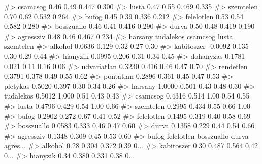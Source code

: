 \documentclass[
  letterpaper,
]{krantz}
\makeatletter
\newenvironment{Shaded}{\begin{snugshade}}{\end{snugshade}}
\newcommand{\CommentTok}[1]{\textcolor[rgb]{0.37,0.37,0.37}{#1}}
\newenvironment{kframe}{%
\medskip{}
\setlength{\fboxsep}{.8em}
 \def\at@end@of@kframe{}%
 \ifinner\ifhmode%
  \def\at@end@of@kframe{\end{minipage}}%
  \begin{minipage}{\columnwidth}%
 \fi\fi%
 \def\FrameCommand##1{\hskip\@totalleftmargin \hskip-\fboxsep
 \colorbox{shadecolor}{##1}\hskip-\fboxsep
     \hskip-\linewidth \hskip-\@totalleftmargin \hskip\columnwidth}%
 \MakeFramed {\advance\hsize-\width
   \@totalleftmargin\z@ \linewidth\hsize
   \@setminipage}}%
 {\par\unskip\endMakeFramed%
 \at@end@of@kframe}
\renewenvironment{Shaded}{\begin{kframe}}{\end{kframe}}
\makeatother
\begin{document}
\begin{Shaded}
\begin{Highlighting}[]
\CommentTok{\#\textgreater{} csamcsog           0.46      0.49     0.447    0.300}
\CommentTok{\#\textgreater{} lusta              0.47      0.55     0.469    0.335}
\CommentTok{\#\textgreater{} szemtelen          0.70      0.62     0.532    0.264}
\CommentTok{\#\textgreater{} bufog              0.45      0.39     0.336    0.212}
\CommentTok{\#\textgreater{} felelotlen         0.53      0.54     0.582    0.280}
\CommentTok{\#\textgreater{} bosszuallo         0.46      0.41     0.416    0.290}
\CommentTok{\#\textgreater{} durva              0.50      0.48     0.419    0.190}
\CommentTok{\#\textgreater{} agressziv          0.48      0.46     0.467    0.234}
\CommentTok{\#\textgreater{}             harsany tudalekos csamcsog lusta szemtelen}
\CommentTok{\#\textgreater{} alkohol      0.0636     0.129     0.32  0.27      0.30}
\CommentTok{\#\textgreater{} kabitoszer  {-}0.0092     0.135     0.30  0.29      0.44}
\CommentTok{\#\textgreater{} hianyzik     0.0995     0.206     0.31  0.34      0.45}
\CommentTok{\#\textgreater{} dohanyzas    0.1781     0.021     0.11  0.16      0.06}
\CommentTok{\#\textgreater{} udvariatlan  0.3230     0.416     0.46  0.47      0.70}
\CommentTok{\#\textgreater{} rendetlen    0.3791     0.378     0.49  0.55      0.62}
\CommentTok{\#\textgreater{} pontatlan    0.2896     0.361     0.45  0.47      0.53}
\CommentTok{\#\textgreater{} pletykas     0.5020     0.397     0.30  0.34      0.26}
\CommentTok{\#\textgreater{} harsany      1.0000     0.501     0.43  0.48      0.30}
\CommentTok{\#\textgreater{} tudalekos    0.5012     1.000     0.51  0.43      0.43}
\CommentTok{\#\textgreater{} csamcsog     0.4316     0.514     1.00  0.54      0.55}
\CommentTok{\#\textgreater{} lusta        0.4796     0.429     0.54  1.00      0.66}
\CommentTok{\#\textgreater{} szemtelen    0.2995     0.434     0.55  0.66      1.00}
\CommentTok{\#\textgreater{} bufog        0.2902     0.272     0.67  0.41      0.52}
\CommentTok{\#\textgreater{} felelotlen   0.1495     0.319     0.40  0.58      0.69}
\CommentTok{\#\textgreater{} bosszuallo   0.0583     0.333     0.46  0.47      0.60}
\CommentTok{\#\textgreater{} durva        0.1358     0.229     0.44  0.54      0.66}
\CommentTok{\#\textgreater{} agressziv    0.1348     0.309     0.45  0.53      0.60}
\CommentTok{\#\textgreater{}             bufog felelotlen bosszuallo durva agres...}
\CommentTok{\#\textgreater{} alkohol      0.28      0.304      0.372  0.39     0...}
\CommentTok{\#\textgreater{} kabitoszer   0.30      0.487      0.564  0.42     0...}
\CommentTok{\#\textgreater{} hianyzik     0.34      0.380      0.331  0.38     0...}

\end{Highlighting}
\end{Shaded}
\end{document}
